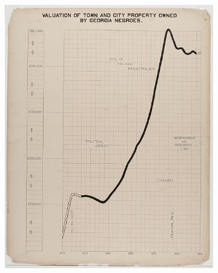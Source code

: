 \documentclass[../main.tex]{subfiles}
\begin{document}
\begin{figure}[H]
\begin{subfigure}{.24\textwidth}
        \includegraphics[width=1\textwidth]{figures/intro/du_bois_line.png}
        \caption{}
        \label{fig:intro_dpb}
    \end{subfigure}
    \begin{subfigure}{.24\textwidth}

\end{subfigure}
\end{figure}
\end{document}
